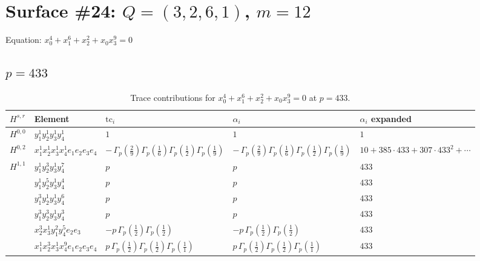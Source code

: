 \documentclass[11pt]{article}
\begin{document}
\newpage

\section*{Surface \#24: $Q=(3, 2, 6, 1)$, $m=12$}

Equation: $x_0^{4} + x_1^{6} + x_2^{2} + x_0 x_3^{9} = 0$

\subsection*{$p = 433$}

\begin{table}[ht]
\centering
\caption{Trace contributions for $x_0^{4} + x_1^{6} + x_2^{2} + x_0 x_3^{9} = 0$ at $p=433$.}\label{tab:deformed-24}
\renewcommand{\arraystretch}{1.1}
{\scriptsize
\begin{tabular}{@{}lllll@{}}
\toprule
$H^{s,r}$ & Element & $\mathrm{tc}_i$ & $\alpha_i$ & $\alpha_i$ expanded \\
\midrule
$H^{0,0}$ & $y_{1}^{1} y_{2}^{1} y_{3}^{1} y_{4}^{1}$ & $1$ & $1$ & $1$ \\
\midrule
$H^{0,2}$ & $x_{1}^{1} x_{2}^{1} x_{3}^{1} x_{4}^{1}  e_{1} e_{2} e_{3} e_{4}$ & $- \, \Gamma_p \left( \frac{2}{9} \right) \Gamma_p \left( \frac{1}{6} \right) \Gamma_p \left( \frac{1}{2} \right) \Gamma_p \left( \frac{1}{9} \right)$ & $- \, \Gamma_p \left( \frac{2}{9} \right) \Gamma_p \left( \frac{1}{6} \right) \Gamma_p \left( \frac{1}{2} \right) \Gamma_p \left( \frac{1}{9} \right)$ & $10{+}385{\cdot}433{+}307{\cdot}433^{2}{+}\cdots$ \\
\midrule
$H^{1,1}$ & $y_{1}^{1} y_{2}^{3} y_{3}^{1} y_{4}^{7}$ & $p \,$ & $p \,$ & $433$ \\
 & $y_{1}^{1} y_{2}^{5} y_{3}^{1} y_{4}^{4}$ & $p \,$ & $p \,$ & $433$ \\
 & $y_{1}^{3} y_{2}^{1} y_{3}^{1} y_{4}^{6}$ & $p \,$ & $p \,$ & $433$ \\
 & $y_{1}^{3} y_{2}^{3} y_{3}^{1} y_{4}^{3}$ & $p \,$ & $p \,$ & $433$ \\
 & $x_{2}^{3} x_{3}^{1} y_{1}^{2} y_{4}^{5} e_{2} e_{3}$ & $- p \, \Gamma_p \left( \frac{1}{2} \right) \Gamma_p \left( \frac{1}{2} \right)$ & $- p \, \Gamma_p \left( \frac{1}{2} \right) \Gamma_p \left( \frac{1}{2} \right)$ & $433$ \\
 & $x_{1}^{1} x_{2}^{3} x_{3}^{1} x_{4}^{9}  e_{1} e_{2} e_{3} e_{4}$ & $p \, \Gamma_p \left( \frac{1}{2} \right) \Gamma_p \left( \frac{1}{2} \right) \Gamma_p \left( \frac{1}{1} \right)$ & $p \, \Gamma_p \left( \frac{1}{2} \right) \Gamma_p \left( \frac{1}{2} \right) \Gamma_p \left( \frac{1}{1} \right)$ & $433$ \\

\end{tabular}}
\end{table}
\end{document}
